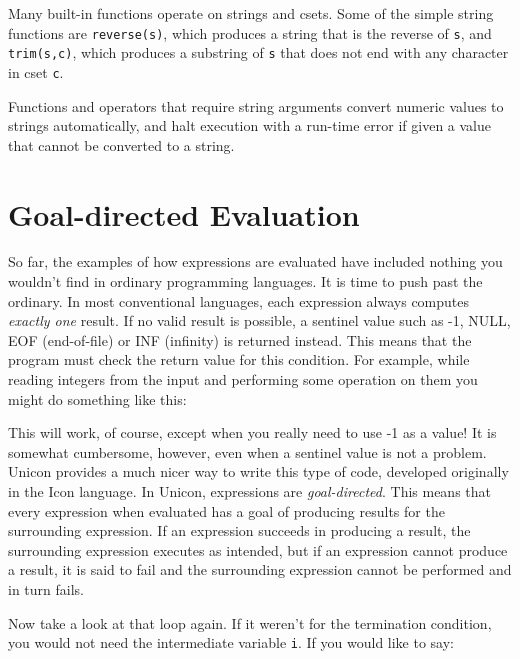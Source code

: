 Many built-in functions operate on strings and csets. Some of the simple
string functions are \texttt{reverse(s)}, which
produces a string that is the reverse of \texttt{s}, and
\texttt{trim(s,c)}, which produces a substring of
\texttt{s} that does not end with any character in cset \texttt{c}.

Functions and operators that require string arguments convert numeric
values to strings automatically, and halt execution with a run-time
error if given a value that cannot be converted to a string.

\section{Goal-directed Evaluation}

So far, the examples of how
expressions are evaluated have included nothing you
wouldn't find in ordinary programming languages. It is
time to push past the ordinary.
In most conventional languages, each expression always computes
\textit{exactly one} result. If no valid result is possible, a
sentinel value such as -1, NULL, EOF
(end-of-file) or INF (infinity) is
returned instead. This means that the program must check the return
value for this condition. For example, while reading integers from the
input and performing some operation on them you might do something like
this:


This will work, of course, except when you really need to use -1 as a
value! It is somewhat cumbersome, however, even when a sentinel value
is not a problem. Unicon provides a much nicer way to write this type
of code, developed originally in the Icon language. In Unicon,
expressions are \textit{goal-directed}. This means that every
expression when evaluated has a goal of producing results for the
surrounding expression. If an expression succeeds in producing a
result, the surrounding expression executes as intended, but if an
expression cannot produce a result, it is said to fail and the surrounding expression cannot be performed and in
turn fails.

Now take a look at that loop again. If it weren't for
the termination condition, you would not need the
intermediate variable \texttt{i}. If you would like to say:

